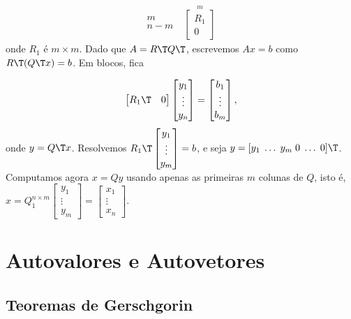 \documentclass{article}
\begin{document}
\[
    \begin{array}{c} 
        m \\ 
        n-m 
    \end{array} \;
    \begin{array}{l} 
        \overset{\displaystyle m}{\left[ \begin{array}{c} R_1 \\ 0 \end{array} \right]} 
    \end{array}
\] onde \(R_1\) é \(m \times m\). Dado que \(A = R\T  Q\T \), escrevemos \(Ax=b\) como \(R\T  (Q\T  x) = b\). Em blocos, fica

\[
    \begin{bmatrix}
        R_1\T  & 0
    \end{bmatrix} \begin{bmatrix}
        y_1 \\
        \vdots \\
        y_n
    \end{bmatrix} = \begin{bmatrix}
        b_1 \\
        \vdots \\
        b_m
    \end{bmatrix},
\] onde \(y = Q\T  x\). Resolvemos \(R_1\T  \begin{bmatrix}
    y_1 \\
    \vdots \\
    y_m
\end{bmatrix} = b\), e seja \(y = [y_1 \; \ldots \; y_m \; 0 \; \ldots \; 0]\T \). Computamos agora \(x = Q y\) usando apenas as primeiras \(m\) colunas de \(Q\), isto é, \(x = Q_1^{n \times m} \begin{bmatrix}
    y_1 \\
    \vdots \\
    y_m 
\end{bmatrix} = \begin{bmatrix}
    x_1 \\
    \vdots \\
    x_n
\end{bmatrix}\).

\section{Autovalores e Autovetores}
\subsection{Teoremas de Gerschgorin}
\end{document}
